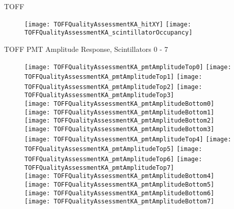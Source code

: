 \documentclass[11pt]{beamer}
\begin{document}
\begin{frame}{TOFF}
\begin{figure}
\centering
\texttt{[image: TOFFQualityAssessmentKA\_hitXY]}
\texttt{[image: TOFFQualityAssessmentKA\_scintillatorOccupancy]} 
\end{figure}
\end{frame}

\begin{frame}{TOFF PMT Amplitude Response, Scintillators 0 - 7}
\begin{figure}
\centering
\texttt{[image: TOFFQualityAssessmentKA\_pmtAmplitudeTop0]}
\texttt{[image: TOFFQualityAssessmentKA\_pmtAmplitudeTop1]}
\texttt{[image: TOFFQualityAssessmentKA\_pmtAmplitudeTop2]}
\texttt{[image: TOFFQualityAssessmentKA\_pmtAmplitudeTop3]} \\ 
\texttt{[image: TOFFQualityAssessmentKA\_pmtAmplitudeBottom0]}
\texttt{[image: TOFFQualityAssessmentKA\_pmtAmplitudeBottom1]}
\texttt{[image: TOFFQualityAssessmentKA\_pmtAmplitudeBottom2]}
\texttt{[image: TOFFQualityAssessmentKA\_pmtAmplitudeBottom3]} \\
\texttt{[image: TOFFQualityAssessmentKA\_pmtAmplitudeTop4]}
\texttt{[image: TOFFQualityAssessmentKA\_pmtAmplitudeTop5]}
\texttt{[image: TOFFQualityAssessmentKA\_pmtAmplitudeTop6]}
\texttt{[image: TOFFQualityAssessmentKA\_pmtAmplitudeTop7]} \\
\texttt{[image: TOFFQualityAssessmentKA\_pmtAmplitudeBottom4]}
\texttt{[image: TOFFQualityAssessmentKA\_pmtAmplitudeBottom5]}
\texttt{[image: TOFFQualityAssessmentKA\_pmtAmplitudeBottom6]}
\texttt{[image: TOFFQualityAssessmentKA\_pmtAmplitudeBottom7]} \\
\end{figure}
\end{frame}
\end{document}

